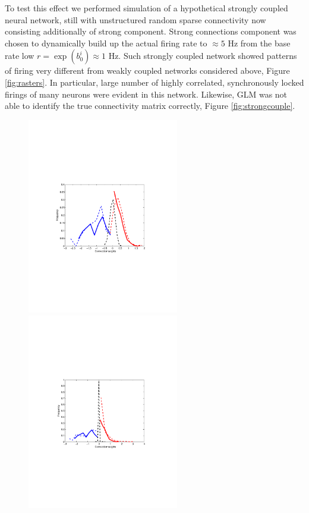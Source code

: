 \documentclass[amsmath,amssymb]{revtex4}
\begin{document}
To test this effect we performed simulation of a hypothetical strongly coupled  neural network, still with unstructured random sparse connectivity now consisting additionally of strong component. Strong connections component was chosen to dynamically build up the actual firing rate to $\approx 5$ Hz from the base rate low $r=\exp(b^i_0)\approx 1$ Hz. Such strongly coupled network showed patterns of firing very different from weakly coupled networks considered above, Figure \ref{fig:rasters}.
In particular, large number of highly correlated, synchronously locked firings of many neurons were evident in this network.
Likewise, GLM was not able to identify the true connectivity matrix correctly, Figure \ref{fig:strongcouple}. 
\begin{figure}
\centering
\begin{minipage}[c]{0.45\hsize}
\includegraphics[width=250px]{Figure5a_hist_glm_vanilla}
\end{minipage}
\begin{minipage}[c]{0.45\hsize}
\includegraphics[width=250px]{Figure5b_hist_glm_sparse}

\end{minipage}
\end{figure}
\end{document}
